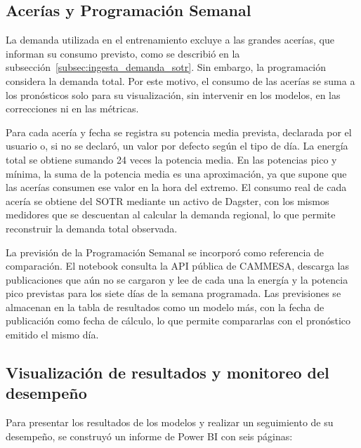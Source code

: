 \subsection{Acerías y Programación Semanal}
\label{subsec:acerias_psem}

La demanda utilizada en el entrenamiento excluye a las grandes acerías, que informan su consumo previsto, como se describió en la subsección~\ref{subsec:ingesta_demanda_sotr}. Sin embargo, la programación considera la demanda total. Por este motivo, el consumo de las acerías se suma a los pronósticos solo para su visualización, sin intervenir en los modelos, en las correcciones ni en las métricas.

Para cada acería y fecha se registra su potencia media prevista, declarada por el usuario o, si no se declaró, un valor por defecto según el tipo de día. La energía total se obtiene sumando 24 veces la potencia media. En las potencias pico y mínima, la suma de la potencia media es una aproximación, ya que supone que las acerías consumen ese valor en la hora del extremo. El consumo real de cada acería se obtiene del SOTR mediante un activo de Dagster, con los mismos medidores que se descuentan al calcular la demanda regional, lo que permite reconstruir la demanda total observada.

La previsión de la Programación Semanal se incorporó como referencia de comparación. El notebook  consulta la API pública de CAMMESA, descarga las publicaciones que aún no se cargaron y lee de cada una la energía y la potencia pico previstas para los siete días de la semana programada. Las previsiones se almacenan en la tabla de resultados como un modelo más, con la fecha de publicación como fecha de cálculo, lo que permite compararlas con el pronóstico emitido el mismo día.

\subsection{Visualización de resultados y monitoreo del desempeño}
\label{subsec:monitoreo}

Para presentar los resultados de los modelos y realizar un seguimiento de su desempeño, se construyó un informe de Power BI con seis páginas:


